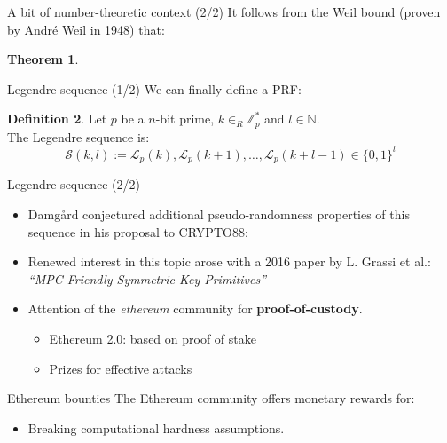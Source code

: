 \documentclass{beamer}
\newtheorem{thm}{Theorem}
\theoremstyle{definition}
\newtheorem{defn}[thm]{Definition}
\theoremstyle{remark}
\newcommand{\Z}{\mathbb{Z}}
\newcommand{\N}{\mathbb{N}}
\renewcommand{\L}{\mathcal{L}}
\renewcommand{\S}{\mathcal{S}}
\begin{document}
\begin{frame}{A bit of number-theoretic context (2/2)}
It follows from the Weil bound (proven by Andr\'e  Weil in 1948) that:
\bigskip
\begin{thm}
\end{thm}
\end{frame}
\begin{frame}{Legendre sequence (1/2)}
We can finally define a PRF:
\bigskip
\begin{defn}
Let $p$ be a $n$-bit prime, $k \in_R \Z_p^*$ and $l\in\N$.\\
The Legendre sequence is:
\[\S(k,l) := \L_p(k), \L_p(k+1), \ldots,\L_p(k+l-1)\in \{0,1\}^l\]
\end{defn}
\end{frame}
\begin{frame}{Legendre sequence (2/2)}
\begin{itemize}
\item Damg\aa rd conjectured additional pseudo-randomness properties of this sequence in his proposal to CRYPTO88:
\medskip
\item Renewed interest in this topic arose with a 2016 paper by L. Grassi et al.: \textit{``MPC-Friendly Symmetric Key Primitives''}
\medskip
\item Attention of the \textit{ethereum} community for \textbf{proof-of-custody}.
\begin{itemize}
\item Ethereum 2.0: based on proof of stake
\item Prizes for effective attacks
\end{itemize}
\end{itemize}
\end{frame}
\begin{frame}{Ethereum bounties}
The Ethereum community offers monetary rewards for:
\begin{itemize}
\item Breaking computational hardness assumptions.
\end{itemize}
\end{frame}
\end{document}
